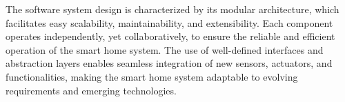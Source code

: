 The software system design is characterized by its modular architecture, which facilitates easy scalability, maintainability, and extensibility. Each component operates independently, yet collaboratively, to ensure the reliable and efficient operation of the smart home system. The use of well-defined interfaces and abstraction layers enables seamless integration of new sensors, actuators, and functionalities, making the smart home system adaptable to evolving requirements and emerging technologies.